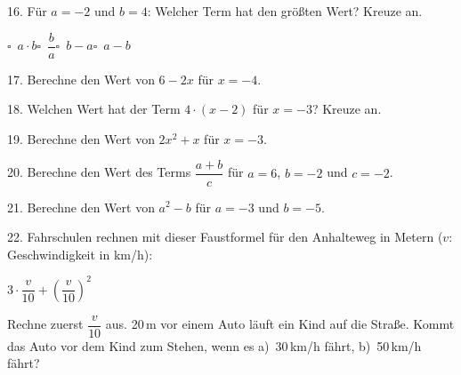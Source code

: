\documentclass[11pt]{article}
\begin{document}
\begin{pfaufg}{}{16.}{}
Für $a = -2$ und $b = 4$: Welcher Term hat den größten Wert? Kreuze an.\par\medskip\noindent\hspace*{7mm}\mbox{$\square$\ $a \cdot b$}\hspace{10mm}\mbox{$\square$\ $\dfrac{b}{a}$}\hspace{10mm}\mbox{$\square$\ $b - a$}\hspace{10mm}\mbox{$\square$\ $a - b$}\rule[-3mm]{0pt}{8mm}\par\smallskip 
{}
\end{pfaufg}

\begin{pfaufg}{}{17.}{}
Berechne den Wert von $6 - 2x$ für $x = -4$.
\end{pfaufg}

\begin{pfaufg}{}{18.}{}
Welchen Wert hat der Term $4 \cdot (x - 2)$ für $x = -3$? Kreuze an.\par\smallskip {}\par {}
\end{pfaufg}

\begin{pfaufg}{}{19.}{}
Berechne den Wert von $2x^2 + x$ für $x = -3$.
\end{pfaufg}

\begin{pfaufg}{}{20.}{}
Berechne den Wert des Terms $\dfrac{a + b}{c}$ für $a = 6$, $b = -2$ und $c = -2$.
\end{pfaufg}

\begin{pfaufg}{}{21.}{}
Berechne den Wert von $a^2 - b$ für $a = -3$ und $b = -5$.
\end{pfaufg}

\begin{pfaufg}{}{22.}{}
Fahrschulen rechnen mit dieser Faustformel für den Anhalteweg in Metern ($v$: Geschwindigkeit in km/h): \par\vspace{3pt}\hspace*{15mm}$3 \cdot \dfrac{v}{10} + \left(\dfrac{v}{10}\right)^2$\par\vspace{3pt} Rechne zuerst $\dfrac{v}{10}$ aus. 20\,m vor einem Auto läuft ein Kind auf die Straße. Kommt das Auto vor dem Kind zum Stehen, wenn es a)~30\,km/h fährt, b)~50\,km/h fährt?
\end{pfaufg}

\par\vfill{}
\end{document}
